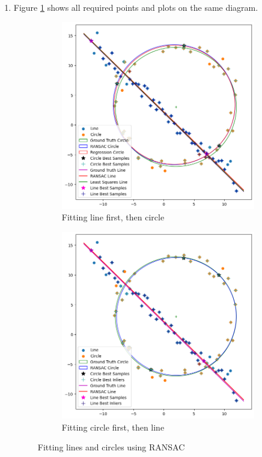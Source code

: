 \documentclass{article}[a4paper]
\begin{document}
\begin{enumerate}
		\item Figure \ref{linefirst} shows all required points and plots on the same diagram.
		\begin{figure}[H]
			\centering
			\begin{subfigure}{0.45\textwidth}
				\includegraphics[width=\textwidth]{imgs/q2graph.png}
				\caption{Fitting line first, then circle}
				\label{linefirst}
			\end{subfigure}
			\hfill
			\begin{subfigure}{0.45\textwidth}
				\includegraphics[width=\textwidth]{imgs/q2graph_circlefirst.png}
				\caption{Fitting circle first, then line}
				\label{circlefirst}
			\end{subfigure}
			\caption{Fitting lines and circles using RANSAC}
			\label{q2graph}
		\end{figure}


\end{enumerate}
\end{document}
